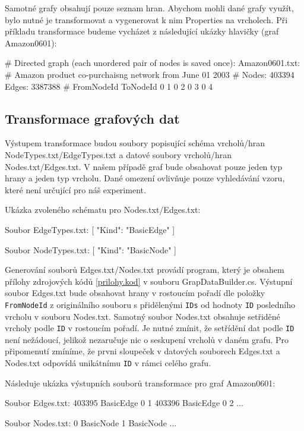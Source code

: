 Samotné grafy obsahují pouze seznam hran. Abychom mohli dané grafy využít, bylo nutné je transformovat a vygenerovat k nim Properties na vrcholech. 
Při příkladu transformace budeme vycházet z následující ukázky hlavičky (graf Amazon0601):

\begin{code}
# Directed graph (each unordered pair of nodes is saved once): 
    Amazon0601.txt: 
# Amazon product co-purchaisng network from June 01 2003
# Nodes: 403394 Edges: 3387388
# FromNodeId	ToNodeId
0	1
0	2
0	3
0	4
\end{code}

\subsection{Transformace grafových dat}

Výstupem transformace budou soubory popisující schéma vrcholů/hran NodeTypes.txt/EdgeTypes.txt a datové soubory vrcholů/hran Nodes.txt/Edges.txt.
V našem případě graf bude obsahovat pouze jeden typ hrany a jeden typ vrcholu. Dané omezení ovlivňuje pouze vyhledávání vzoru, které není určující pro náš experiment. 

Ukázka zvoleného schématu pro Nodes.txt/Edges.txt:
\begin{code}
Soubor EdgeTypes.txt:
[
{ "Kind": "BasicEdge" }
]

Soubor NodeTypes.txt:
[ 
{ "Kind": "BasicNode" }
]

\end{code}

Generování souborů Edges.txt/Nodes.txt provádí program, který je obsahem přílohy zdrojových kódů \ref{prilohy.kod} v souboru GrapDataBuilder.cs.
Výstupní soubor Edges.txt bude obsahovat hrany v rostoucím pořadí dle položky \verb+FromNodeId+ z originálního souboru s přidělenými \verb+IDs+ od hodnoty \verb+ID+ posledního vrcholu v souboru Nodes.txt.
Samotný soubor Nodes.txt obsahuje setřiděné vrcholy podle \verb+ID+ v rostoucím pořadí. Je nutné zmínit, že setřídění dat podle \verb+ID+ není nežádoucí, jelikož nezaručuje nic o seskupení vrcholů v daném grafu.
Pro připomenutí zmíníme, že prvni sloupeček v datových souborech Edges.txt a Nodes.txt odpovídá unikátnímu \verb+ID+ v rámci celého grafu.

Následuje ukázka výstupních souborů transformace pro graf Amazon0601:  
\begin{code}
Soubor Edges.txt:
403395 BasicEdge 0 1
403396 BasicEdge 0 2
...

Soubor Nodes.txt:
0 BasicNode 
1 BasicNode 
...
\end{code}

